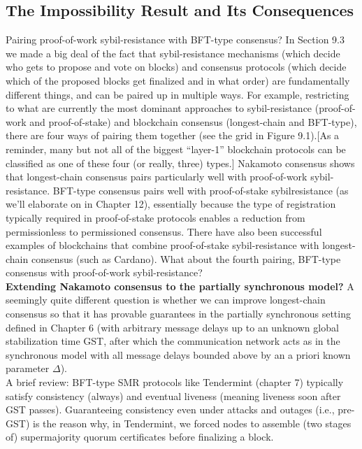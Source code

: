 \subsection{The Impossibility Result and Its Consequences}
Pairing proof-of-work sybil-resistance with BFT-type consensus? In Section 9.3 we
made a big deal of the fact that sybil-resistance mechanisms (which decide who gets to
propose and vote on blocks) and consensus protocols (which decide which of the proposed
blocks get finalized and in what order) are fundamentally different things, and can be paired
up in multiple ways. For example, restricting to what are currently the most dominant
approaches to sybil-resistance (proof-of-work and proof-of-stake) and blockchain consensus
(longest-chain and BFT-type), there are four ways of pairing them together (see the grid in
Figure 9.1).[As a reminder, many but not all of the biggest “layer-1” blockchain protocols can be classified as one
of these four (or really, three) types.] Nakamoto consensus shows that longest-chain consensus pairs particularly well
with proof-of-work sybil-resistance. BFT-type consensus pairs well with proof-of-stake sybilresistance (as we’ll elaborate on in Chapter 12), essentially because the type of registration
typically required in proof-of-stake protocols enables a reduction from permissionless to permissioned consensus. There have also been successful examples of blockchains that combine
proof-of-stake sybil-resistance with longest-chain consensus (such as Cardano). What about
the fourth pairing, BFT-type consensus with proof-of-work sybil-resistance?\\

\noindent
\textbf{Extending Nakamoto consensus to the partially synchronous model?} A seemingly quite different question is whether we can improve longest-chain consensus so that
it has provable guarantees in the partially synchronous setting defined in Chapter 6 (with
arbitrary message delays up to an unknown global stabilization time GST, after which the
communication network acts as in the synchronous model with all message delays bounded
above by an a priori known parameter $\Delta$).\\
A brief review: BFT-type SMR protocols like Tendermint (chapter 7) typically satisfy
consistency (always) and eventual liveness (meaning liveness soon after GST passes). Guaranteeing consistency even under attacks and outages (i.e., pre-GST) is the reason why, in
Tendermint, we forced nodes to assemble (two stages of) supermajority quorum certificates
before finalizing a block.\\

